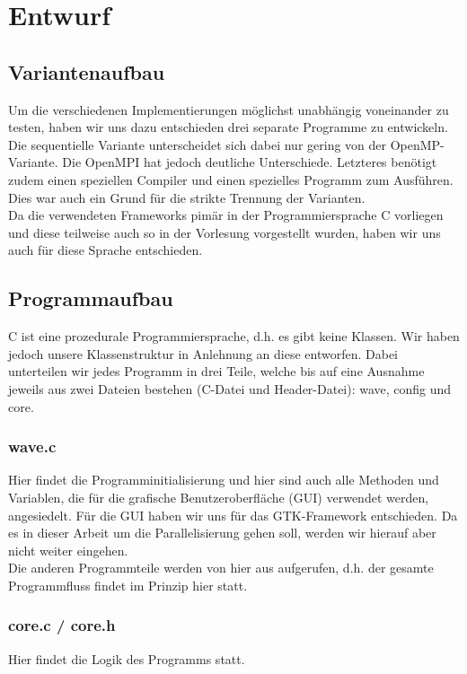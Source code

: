 
\section{Entwurf}
\subsection{Variantenaufbau}
Um die verschiedenen Implementierungen möglichst unabhängig voneinander zu testen, haben wir uns dazu entschieden drei separate Programme zu entwickeln. Die sequentielle Variante unterscheidet sich dabei nur gering von der OpenMP-Variante. Die OpenMPI hat jedoch deutliche Unterschiede. Letzteres benötigt zudem einen speziellen Compiler und einen spezielles Programm zum Ausführen. Dies war auch ein Grund für die strikte Trennung der Varianten.\\
Da die verwendeten Frameworks pimär in der Programmiersprache C vorliegen und diese teilweise auch so in der Vorlesung vorgestellt wurden, haben wir uns auch für diese Sprache entschieden.

\subsection{Programmaufbau}
C ist eine prozedurale Programmiersprache, d.h. es gibt keine Klassen. Wir haben jedoch unsere Klassenstruktur in Anlehnung an diese entworfen. Dabei unterteilen wir jedes Programm in drei Teile, welche bis auf eine Ausnahme jeweils aus zwei Dateien bestehen (C-Datei und Header-Datei): wave, config und core.

\subsubsection{wave.c}%
Hier findet die Programminitialisierung und hier sind auch alle Methoden und Variablen, die für die grafische Benutzeroberfläche (GUI) verwendet werden, angesiedelt. Für die GUI haben wir uns für das GTK-Framework entschieden. Da es in dieser Arbeit um die Parallelisierung gehen soll, werden wir hierauf aber nicht weiter eingehen.\\
Die anderen Programmteile werden von hier aus aufgerufen, d.h. der gesamte Programmfluss findet im Prinzip hier statt.

\subsubsection{core.c / core.h}
Hier findet die Logik des Programms statt.

